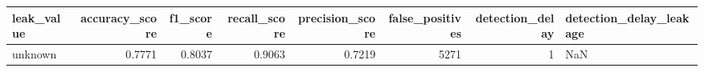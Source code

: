 \begin{tabular}{lrrrrrrl}
\toprule
leak\_value & accuracy\_score & f1\_score & recall\_score & precision\_score & false\_positives & detection\_delay & detection\_delay\_leakage \\
\midrule
unknown & 0.7771 & 0.8037 & 0.9063 & 0.7219 & 5271 & 1 & NaN \\
\bottomrule
\end{tabular}
